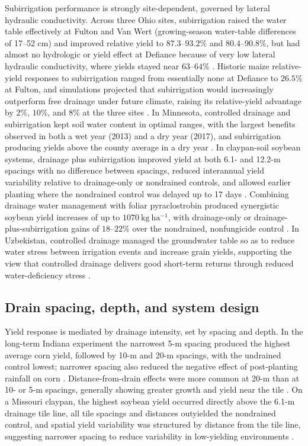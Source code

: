 Subirrigation performance is strongly site-dependent, governed by lateral hydraulic conductivity. Across three Ohio sites, subirrigation raised the water table effectively at Fulton and Van Wert (growing-season water-table differences of 17--52 cm) and improved relative yield to \(87.3\textrm{--}93.2\%\) and \(80.4\textrm{--}90.8\%\), but had almost no hydrologic or yield effect at Defiance because of very low lateral hydraulic conductivity, where yields stayed near \(63\textrm{--}64\%\) \parencite{Gunn2018,Gunn2019}. Historic maize relative-yield responses to subirrigation ranged from essentially none at Defiance to \(26.5\%\) at Fulton, and simulations projected that subirrigation would increasingly outperform free drainage under future climate, raising its relative-yield advantage by \(2\%\), \(10\%\), and \(8\%\) at the three sites \parencite{Gunn2018}. In Minnesota, controlled drainage and subirrigation kept soil water content in optimal ranges, with the largest benefits observed in both a wet year (2013) and a dry year (2017), and subirrigation producing yields above the county average in a dry year \parencite{Niaghi2019}. In claypan-soil soybean systems, drainage plus subirrigation improved yield at both 6.1- and 12.2-m spacings with no difference between spacings, reduced interannual yield variability relative to drainage-only or nondrained controls, and allowed earlier planting where the nondrained control was delayed up to 17 days \parencite{Nelson2011}. Combining drainage water management with foliar pyraclostrobin produced synergistic soybean yield increases of up to \(1070\ \mathrm{kg\ ha^{-1}}\), with drainage-only or drainage-plus-subirrigation gains of \(18\textrm{--}22\%\) over the nondrained, nonfungicide control \parencite{Nelson2011b}. In Uzbekistan, controlled drainage managed the groundwater table so as to reduce water stress between irrigation events and increase grain yields, supporting the view that controlled drainage delivers good short-term returns through reduced water-deficiency stress \parencite{Dukhovny2018}.

\subsection{Drain spacing, depth, and system design}

Yield response is mediated by drainage intensity, set by spacing and depth. In the long-term Indiana experiment the narrowest 5-m spacing produced the highest average corn yield, followed by 10-m and 20-m spacings, with the undrained control lowest; narrower spacing also reduced the negative effect of post-planting rainfall on corn \parencite{Rui2024}. Distance-from-drain effects were more common at 20-m than at 10- or 5-m spacings, generally showing greater growth and yield near the tile \parencite{Kladivko2005}. On a Missouri claypan, the highest soybean yield occurred directly above the 6.1-m drainage tile line, all tile spacings and distances outyielded the nondrained control, and spatial yield variability was structured by distance from the tile line, suggesting narrower spacing to reduce variability in low-yielding environments \parencite{Nelson2017}.

